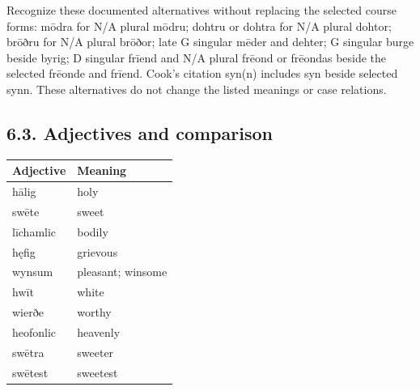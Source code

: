 Recognize these documented alternatives without replacing the selected course forms: mōdra for N/\allowbreak{}A plural mōdru; dohtru or dohtra for N/\allowbreak{}A plural dohtor; brōðru for N/\allowbreak{}A plural brōðor; late G singular mēder and dehter; G singular burge beside byrig; D singular frīend and N/\allowbreak{}A plural frēond or frēondas beside the selected frēonde and frīend. Cook’s citation syn(n) includes syn beside selected synn. These alternatives do not change the listed meanings or case relations.

\subsection*{6.3. Adjectives and comparison}

\par\begingroup
\fontsize{10.5}{13.2}\selectfont
\setlength{\LTleft}{0pt}\setlength{\LTright}{\fill}
\noindent
\begin{tabular}{@{}>{\raggedright\arraybackslash}p{53.62mm}>{\raggedright\arraybackslash}p{67.56mm}@{}}
\toprule
\textbf{Adjective} & \textbf{Meaning} \\
\midrule
hālig & holy \\
swēte & sweet \\
līchamlic & bodily \\
hęfig & grievous \\
wynsum & pleasant; winsome \\
hwīt & white \\
wierðe & worthy \\
heofonlic & heavenly \\
swētra & sweeter \\
swētest & sweetest \\
\bottomrule
\end{tabular}
\par\endgroup

